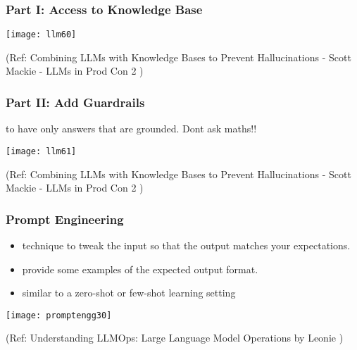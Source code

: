 \begin{frame}[fragile]\frametitle{Part I: Access to Knowledge Base}

\begin{center}
\texttt{[image: llm60]}
\end{center}		


{\tiny (Ref: Combining LLMs with Knowledge Bases to Prevent Hallucinations - Scott Mackie - LLMs in Prod Con 2 )}

\end{frame}

\begin{frame}[fragile]\frametitle{Part II: Add Guardrails}

to have only answers that are grounded. Dont ask maths!!

\begin{center}
\texttt{[image: llm61]}
\end{center}		


{\tiny (Ref: Combining LLMs with Knowledge Bases to Prevent Hallucinations - Scott Mackie - LLMs in Prod Con 2 )}

\end{frame}



\begin{frame}[fragile]\frametitle{Prompt Engineering}

\begin{itemize}
\item technique to tweak the input so that the output matches your expectations. 
\item provide some examples of the expected output format. 
\item similar to a zero-shot or few-shot learning setting
\end{itemize}	

\begin{center}
\texttt{[image: promptengg30]}
\end{center}		

{\tiny (Ref: Understanding LLMOps: Large Language Model Operations by Leonie )}

\end{frame}



